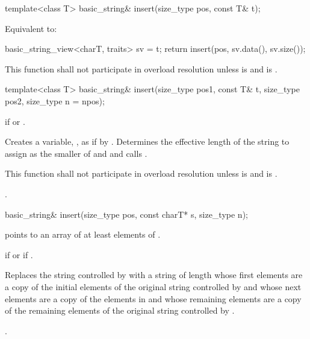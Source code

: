 %
\begin{itemdecl}
template<class T>
  basic_string& insert(size_type pos, const T& t);
\end{itemdecl}

\begin{itemdescr}
\pnum
\effects
Equivalent to:
\begin{codeblock}
{
  basic_string_view<charT, traits> sv = t;
  return insert(pos, sv.data(), sv.size());
}
\end{codeblock}

\pnum
\remarks
This function shall not participate in overload resolution unless
 is  and
 is .
\end{itemdescr}

%
\begin{itemdecl}
template<class T>
  basic_string& insert(size_type pos1, const T& t, size_type pos2, size_type n = npos);
\end{itemdecl}

\begin{itemdescr}
\pnum
\throws
{}
if
or
.

\pnum
\effects
Creates a variable, , as if by .
Determines the effective length  of the string to assign
as the smaller of  and 
and calls .

\pnum
\remarks
This function shall not participate in overload resolution
unless 
is  and  is .

\pnum
\returns
{}.
\end{itemdescr}

%
\begin{itemdecl}
basic_string& insert(size_type pos, const charT* s, size_type n);
\end{itemdecl}

\begin{itemdescr}
\pnum
\requires {} points to an array of at least 
elements of .

\pnum
\throws {} if  or 
if .

\pnum
\effects Replaces the string controlled by  with a string of
length  whose first  elements are a copy of
the initial elements of the original string controlled by  and
whose next  elements are a copy of the elements in  and
whose remaining elements are a copy of the remaining elements of the original
string controlled by .

\pnum
\returns
{}.
\end{itemdescr}

